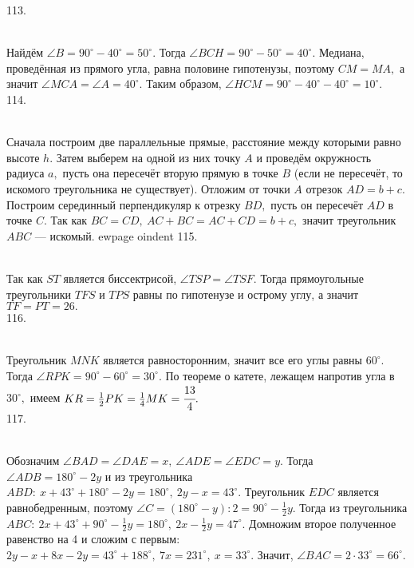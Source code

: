 113. \begin{figure}[ht!]
\end{figure}\\
Найдём $\angle B=90^\circ-40^\circ=50^\circ.$ Тогда $\angle BCH=90^\circ-50^\circ=40^\circ.$ Медиана, проведённая из прямого угла, равна половине гипотенузы, поэтому $CM=MA,$ а значит $\angle MCA=\angle A=40^\circ.$ Таким образом, $\angle HCM=90^\circ-40^\circ-40^\circ=10^\circ.$\\
114. \begin{figure}[ht!]
\end{figure}\\
Сначала построим две параллельные прямые, расстояние между которыми равно высоте $h.$ Затем выберем на одной из них точку $A$ и проведём окружность радиуса $a,$ пусть она пересечёт вторую прямую в точке $B$ (если не пересечёт, то искомого треугольника не существует). Отложим от точки $A$ отрезок $AD=b+c.$ Построим серединный перпендикуляр к отрезку $BD,$ пусть он пересечёт $AD$ в точке $C.$ Так как $BC=CD,\ AC+BC=AC+CD=b+c,$ значит треугольник $ABC$ --- искомый.
ewpage
oindent
115. \begin{figure}[ht!]
\end{figure}\\
Так как $ST$ является биссектрисой, $\angle TSP=\angle TSF.$ Тогда прямоугольные треугольники $TFS$ и $TPS$ равны по гипотенузе и острому углу, а значит $TF=PT=26.$\\
116. \begin{figure}[ht!]
\end{figure}\\
Треугольник $MNK$ является равносторонним, значит все его углы равны $60^\circ.$ Тогда $\angle RPK=90^\circ-60^\circ=30^\circ.$ По теореме о катете, лежащем напротив угла в $30^\circ,$ имеем $KR=\frac{1}{2}PK=\frac{1}{4}MK=\cfrac{13}{4}.$\\
117. \begin{figure}[ht!]
\end{figure}\\
Обозначим $\angle BAD=\angle DAE=x,\ \angle ADE=\angle EDC=y.$ Тогда $\angle ADB=180^\circ-2y$ и из треугольника $ABD:\ x+43^\circ+180^\circ-2y=180^\circ,\ 2y-x=43^\circ.$ Треугольник $EDC$ является равнобедренным, поэтому $\angle C=(180^\circ-y):2=90^\circ-\frac{1}{2}y.$ Тогда из треугольника $ABC:\ 2x+43^\circ+90^\circ-\frac{1}{2}y=180^\circ,\ 2x-\frac{1}{2}y=47^\circ.$ Домножим второе полученное равенство на 4 и сложим с первым: $2y-x+8x-2y=43^\circ+188^\circ,\ 7x=231^\circ,\ x=33^\circ.$ Значит, $\angle BAC=2\cdot33^\circ=66^\circ.$
